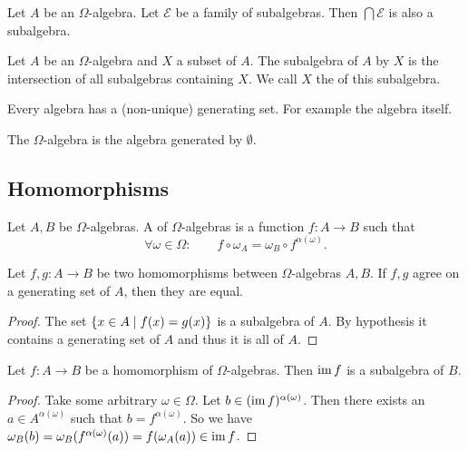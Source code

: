 \begin{lemma} \label{intersectionSubalgebra}
Let $A$ be an $\Omega$-algebra. Let $\mathcal{E}$ be a family of subalgebras. Then $\bigcap \mathcal{E}$ is also a subalgebra. 
\end{lemma}

\begin{definition}
Let $A$ be an $\Omega$-algebra and $X$ a subset of $A$. The subalgebra of $A$  by $X$ is the intersection of all subalgebras containing $X$. We call $X$ the  of this subalgebra.
\end{definition}
Every algebra has a (non-unique) generating set. For example the algebra itself.

\begin{definition}
The  $\Omega$-algebra is the algebra generated by $\emptyset$.
\end{definition}

\subsection{Homomorphisms}
\begin{definition}
Let $A,B$ be $\Omega$-algebras. A  of $\Omega$-algebras is a function $f:A\to B$ such that
\[ \forall \omega\in\Omega: \qquad f\circ \omega_A = \omega_B\circ f^{\alpha(\omega)}. \]
\end{definition}

\begin{proposition}
Let $f,g:A\to B$ be two homomorphisms between $\Omega$-algebras $A,B$. If $f,g$ agree on a generating set of $A$, then they are equal.
\end{proposition}
\begin{proof}
The set $\left\{ x\in A \;\middle|\; f(x) = g(x) \right\}$ is a subalgebra of $A$. By hypothesis it contains a generating set of $A$ and thus it is all of $A$.
\end{proof}

\begin{proposition}
Let $f:A\to B$ be a homomorphism of $\Omega$-algebras. Then $\operatorname{im} f$ is a subalgebra of $B$.
\end{proposition}
\begin{proof}
Take some arbitrary $\omega\in\Omega$. Let $b\in(\operatorname{im} f)^{\alpha(\omega)}$. Then there exists an $a\in A^{\alpha(\omega)}$ such that $b = f^{\alpha(\omega)}$. So we have $\omega_B(b) = \omega_B(f^{\alpha(\omega)}(a)) = f(\omega_A(a)) \in \operatorname{im} f$.
\end{proof}

